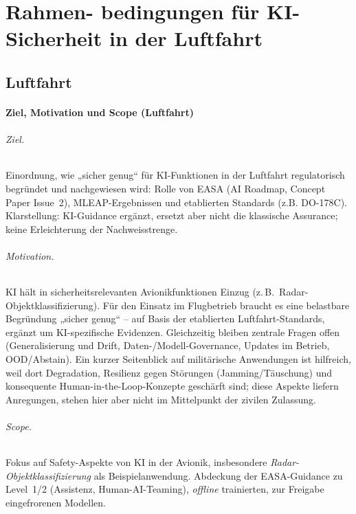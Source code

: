 \part{Rahmen- bedingungen für KI-Sicherheit in der Luftfahrt}
\chapter{Luftfahrt}

\subsection{Ziel, Motivation und Scope (Luftfahrt)}
\paragraph{Ziel.}
Einordnung, wie „sicher genug“ für KI-Funktionen in der Luftfahrt regulatorisch begründet und nachgewiesen wird: Rolle von EASA (AI Roadmap, Concept Paper Issue~2), MLEAP-Ergebnissen und etablierten Standards (z.B. DO-178C). Klarstellung: KI-Guidance ergänzt, ersetzt aber nicht die klassische Assurance; keine Erleichterung der Nachweisstrenge.

\paragraph{Motivation.}
KI hält in sicherheitsrelevanten Avionikfunktionen Einzug (z.\,B.\ Radar-Objektklassifizierung). Für den Einsatz im Flugbetrieb braucht es eine belastbare Begründung „sicher genug“ – auf Basis der etablierten Luftfahrt-Standards, ergänzt um KI-spezifische Evidenzen. Gleichzeitig bleiben zentrale Fragen offen (Generalisierung und Drift, Daten-/Modell-Governance, Updates im Betrieb, OOD/Abstain). Ein kurzer Seitenblick auf militärische Anwendungen ist hilfreich, weil dort Degradation, Resilienz gegen Störungen (Jamming/Täuschung) und konsequente Human-in-the-Loop-Konzepte geschärft sind; diese Aspekte liefern Anregungen, stehen hier aber nicht im Mittelpunkt der zivilen Zulassung.

\paragraph{Scope.}
Fokus auf Safety-Aspekte von KI in der Avionik, insbesondere \emph{Radar-Objektklassifizierung} als Beispielanwendung. Abdeckung der EASA-Guidance zu Level~1/2 (Assistenz, Human-AI-Teaming), \emph{offline} trainierten, zur Freigabe eingefrorenen Modellen.





